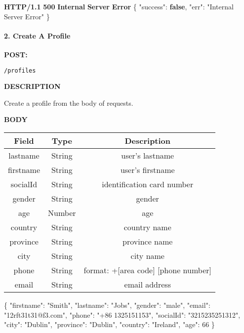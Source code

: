 \documentclass[
]{article}
\newenvironment{Shaded}{}{}
\newcommand{\DataTypeTok}[1]{\textcolor[rgb]{0.56,0.13,0.00}{#1}}
\newcommand{\DecValTok}[1]{\textcolor[rgb]{0.25,0.63,0.44}{#1}}
\newcommand{\ErrorTok}[1]{\textcolor[rgb]{1.00,0.00,0.00}{\textbf{#1}}}
\newcommand{\FunctionTok}[1]{\textcolor[rgb]{0.02,0.16,0.49}{#1}}
\newcommand{\KeywordTok}[1]{\textcolor[rgb]{0.00,0.44,0.13}{\textbf{#1}}}
\newcommand{\StringTok}[1]{\textcolor[rgb]{0.25,0.44,0.63}{#1}}
\begin{document}
\begin{Shaded}
\begin{Highlighting}[]
\ErrorTok{HTTP/1.1} \ErrorTok{500} \ErrorTok{Internal} \ErrorTok{Server} \ErrorTok{Error}
\FunctionTok{\{}
    \DataTypeTok{"success"}\FunctionTok{:} \KeywordTok{false}\FunctionTok{,}
    \DataTypeTok{"err"}\FunctionTok{:} \StringTok{"Internal Server Error"}
\FunctionTok{\}}
\end{Highlighting}
\end{Shaded}

\hypertarget{header-n217}{%
\paragraph{2. Create A Profile}\label{header-n217}}

\textbf{POST:}

\begin{verbatim}
/profiles
\end{verbatim}

\textbf{DESCRIPTION}

Create a profile from the body of requests.

\textbf{BODY}

\begin{longtable}[]{@{}ccc@{}}
\toprule
Field & Type & Description\tabularnewline
\midrule
\endhead
lastname & String & user's lastname\tabularnewline
firstname & String & user's firstname\tabularnewline
socialId & String & identification card number\tabularnewline
gender & String & gender\tabularnewline
age & Number & age\tabularnewline
country & String & country name\tabularnewline
province & String & province name\tabularnewline
city & String & city name\tabularnewline
phone & String & format: +{[}area code{]} {[}phone
number{]}\tabularnewline
email & String & email address\tabularnewline
\bottomrule
\end{longtable}

\begin{Shaded}
\begin{Highlighting}[]
\FunctionTok{\{}
	\DataTypeTok{"firstname"}\FunctionTok{:} \StringTok{"Smith"}\FunctionTok{,}
	\DataTypeTok{"lastname"}\FunctionTok{:} \StringTok{"Jobs"}\FunctionTok{,}
	\DataTypeTok{"gender"}\FunctionTok{:} \StringTok{"male"}\FunctionTok{,}
	\DataTypeTok{"email"}\FunctionTok{:} \StringTok{"12rft31t31@f3.com"}\FunctionTok{,}
	\DataTypeTok{"phone"}\FunctionTok{:} \StringTok{"+86 1325151153"}\FunctionTok{,}
	\DataTypeTok{"socialId"}\FunctionTok{:} \StringTok{"3215235251312"}\FunctionTok{,}
	\DataTypeTok{"city"}\FunctionTok{:} \StringTok{"Dublin"}\FunctionTok{,}
	\DataTypeTok{"province"}\FunctionTok{:} \StringTok{"Dublin"}\FunctionTok{,}
	\DataTypeTok{"country"}\FunctionTok{:} \StringTok{"Ireland"}\FunctionTok{,}
	\DataTypeTok{"age"}\FunctionTok{:} \DecValTok{66}
\FunctionTok{\}}
\end{Highlighting}
\end{Shaded}
\end{document}
